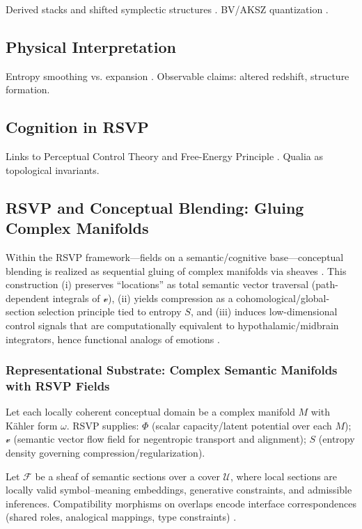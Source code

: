 \documentclass[12pt]{article}
\begin{document}
Derived stacks and shifted symplectic structures \citep{PantevToenVaqVezz2013,ToenVezzosi2008}. BV/AKSZ quantization \citep{AlexandrovKontsevichSchwarzZaboronsky1997,GradyLiLi2017}.

\subsection{Physical Interpretation}

Entropy smoothing vs. expansion \citep{Verlinde2011}. Observable claims: altered redshift, structure formation.

\subsection{Cognition in RSVP}

Links to Perceptual Control Theory \citep{Powers2005} and Free-Energy Principle \citep{Friston2010}. Qualia as topological invariants.

\subsection{RSVP and Conceptual Blending: Gluing Complex Manifolds}

Within the RSVP framework—fields on a semantic/cognitive base—conceptual blending is realized as sequential gluing of complex manifolds via sheaves \citep{FauconnierTurner2002}. This construction (i) preserves “locations” as total semantic vector traversal (path-dependent integrals of $\mathcal{v}$), (ii) yields compression as a cohomological/global-section selection principle tied to entropy $S$, and (iii) induces low-dimensional control signals that are computationally equivalent to hypothalamic/midbrain integrators, hence functional analogs of emotions \citep{Pessoa2017}.

\subsubsection{Representational Substrate: Complex Semantic Manifolds with RSVP Fields}

Let each locally coherent conceptual domain be a complex manifold $M$ with Kähler form $\omega$. RSVP supplies: $\Phi$ (scalar capacity/latent potential over each $M$); $\mathcal{v}$ (semantic vector flow field for negentropic transport and alignment); $S$ (entropy density governing compression/regularization).

Let $\mathcal{F}$ be a sheaf of semantic sections over a cover $\mathcal{U}$, where local sections are locally valid symbol–meaning embeddings, generative constraints, and admissible inferences. Compatibility morphisms on overlaps encode interface correspondences (shared roles, analogical mappings, type constraints) \citep{MacLaneMoerdijk1992}.
\end{document}
